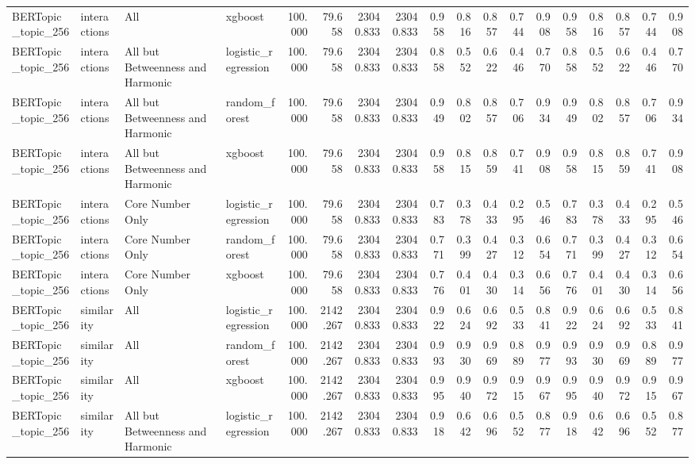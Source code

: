 \begin{tabular}{llllrrrrrrrrrrrrrr}
BERTopic\_topic\_256 & interactions & All & xgboost & 100.000 & 79.658 & 23040.833 & 23040.833 & 0.958 & 0.816 & 0.857 & 0.744 & 0.908 & 0.958 & 0.816 & 0.857 & 0.744 & 0.908 \\
BERTopic\_topic\_256 & interactions & All but Betweenness and Harmonic & logistic\_regression & 100.000 & 79.658 & 23040.833 & 23040.833 & 0.858 & 0.552 & 0.622 & 0.446 & 0.770 & 0.858 & 0.552 & 0.622 & 0.446 & 0.770 \\
BERTopic\_topic\_256 & interactions & All but Betweenness and Harmonic & random\_forest & 100.000 & 79.658 & 23040.833 & 23040.833 & 0.949 & 0.802 & 0.857 & 0.706 & 0.934 & 0.949 & 0.802 & 0.857 & 0.706 & 0.934 \\
BERTopic\_topic\_256 & interactions & All but Betweenness and Harmonic & xgboost & 100.000 & 79.658 & 23040.833 & 23040.833 & 0.958 & 0.815 & 0.859 & 0.741 & 0.908 & 0.958 & 0.815 & 0.859 & 0.741 & 0.908 \\
BERTopic\_topic\_256 & interactions & Core Number Only & logistic\_regression & 100.000 & 79.658 & 23040.833 & 23040.833 & 0.783 & 0.378 & 0.433 & 0.295 & 0.546 & 0.783 & 0.378 & 0.433 & 0.295 & 0.546 \\
BERTopic\_topic\_256 & interactions & Core Number Only & random\_forest & 100.000 & 79.658 & 23040.833 & 23040.833 & 0.771 & 0.399 & 0.427 & 0.312 & 0.654 & 0.771 & 0.399 & 0.427 & 0.312 & 0.654 \\
BERTopic\_topic\_256 & interactions & Core Number Only & xgboost & 100.000 & 79.658 & 23040.833 & 23040.833 & 0.776 & 0.401 & 0.430 & 0.314 & 0.656 & 0.776 & 0.401 & 0.430 & 0.314 & 0.656 \\
BERTopic\_topic\_256 & similarity & All & logistic\_regression & 100.000 & 2142.267 & 23040.833 & 23040.833 & 0.922 & 0.624 & 0.692 & 0.533 & 0.841 & 0.922 & 0.624 & 0.692 & 0.533 & 0.841 \\
BERTopic\_topic\_256 & similarity & All & random\_forest & 100.000 & 2142.267 & 23040.833 & 23040.833 & 0.993 & 0.930 & 0.969 & 0.889 & 0.977 & 0.993 & 0.930 & 0.969 & 0.889 & 0.977 \\
BERTopic\_topic\_256 & similarity & All & xgboost & 100.000 & 2142.267 & 23040.833 & 23040.833 & 0.995 & 0.940 & 0.972 & 0.915 & 0.967 & 0.995 & 0.940 & 0.972 & 0.915 & 0.967 \\
BERTopic\_topic\_256 & similarity & All but Betweenness and Harmonic & logistic\_regression & 100.000 & 2142.267 & 23040.833 & 23040.833 & 0.918 & 0.642 & 0.696 & 0.552 & 0.877 & 0.918 & 0.642 & 0.696 & 0.552 & 0.877 \\

\end{tabular}
